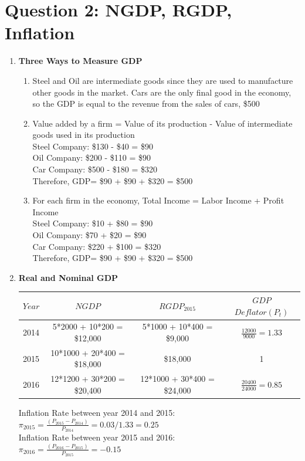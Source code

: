 \documentclass[a4paper, 11pt]{article}
\begin{document}
\section*{Question 2: NGDP, RGDP, Inflation}
\begin{enumerate}[label=\textbf{(\alph*)}]
\item \textbf{Three Ways to Measure GDP}
\begin{enumerate}[label=\textbf{\arabic*.}]
\item Steel and Oil are intermediate goods since they are used to manufacture other goods in the market. Cars are the only final good in the economy, so the GDP is equal to the revenue from the sales of cars, \$500
\item Value added by a firm = Value of its production - Value of intermediate goods used in its production\\

Steel Company: \$130 - \$40 = \$90\\
Oil Company: \$200 - \$110 = \$90\\
Car Company: \$500 - \$180 = \$320\\

Therefore, GDP= \$90 + \$90 + \$320 = \$500
\clearpage
\item For each firm in the economy, Total Income = Labor Income + Profit Income\\

Steel Company: \$10 + \$80 = \$90\\
Oil Company: \$70 + \$20 = \$90\\
Car Company: \$220 + \$100 = \$320\\

Therefore, GDP= \$90 + \$90 + \$320 = \$500


\end{enumerate}
\item \textbf{Real and Nominal GDP}

\begin{center}
 \begin{tabular}{||c| c| c| c ||} 
 \hline
 $Year$ & $NGDP$ & $RGDP_{2015}$ & $GDP$ $Deflator (P_t)$\\ [0.5ex] 
 \hline
 \hline
 2014 & 5*2000 + 10*200 = \$12,000 & 5*1000 + 10*400 = \$9,000& $\frac{12000}{9000} = 1.33$ \\ 
 \hline
 2015 & 10*1000 + 20*400 = \$18,000 & \$18,000& 1\\
 \hline
 2016 & 12*1200 + 30*200 = \$20,400 & 12*1000 + 30*400 = \$24,000&$\frac{20400}{24000} = 0.85$ \\ [1ex] 
 \hline
\end{tabular}
\end{center}


 Inflation Rate between year 2014 and 2015: \\
 $\pi_{2015} = \frac{(P_{2015} - P_{2014})}{P_{2014}} = 0.03/1.33= 0.25$\\
 
 Inflation Rate between year 2015 and 2016: \\
 $\pi_{2016} = \frac{(P_{2016} - P_{2015})}{P_{2015}} = -0.15$
\end{enumerate}
\end{document}
